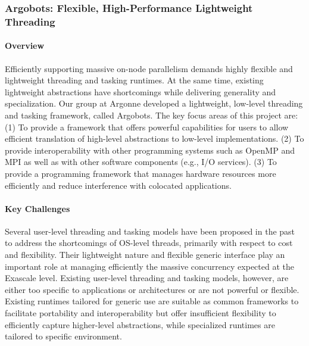 \subsubsection{ Argobots: Flexible, High-Performance Lightweight Threading }

\paragraph{Overview}

Efficiently supporting massive on-node parallelism demands highly
flexible and lightweight threading and tasking runtimes. At the
same time, existing lightweight abstractions have shortcomings while
delivering generality and specialization.  Our group at Argonne
developed a lightweight, low-level threading and tasking framework,
called Argobots.  The key focus areas of this project are: (1) To
provide a framework that offers powerful capabilities for users to
allow efficient translation of high-level abstractions to low-level
implementations. (2) To provide interoperability with other
programming systems such as OpenMP and MPI as well as with other
software components (e.g., I/O services). (3) To provide a programming
framework that manages hardware resources more efficiently and reduce
interference with colocated applications.

\paragraph{Key Challenges}

Several user-level threading and tasking models have been proposed in
the past to address the shortcomings of OS-level threads, primarily
with respect to cost and flexibility. Their lightweight nature and
flexible generic interface play an important role at managing
efficiently the massive concurrency expected at the Exascale level.
Existing user-level threading and tasking models, however, are either
too specific to applications or architectures or are not powerful or
flexible. Existing runtimes tailored for generic use \cite{GNUPth,
PLDI97_Taura, COSET05_Thibault, COB14_Nakashima, MTAAP08_Wheeler,
PPoPP99_Taura, SenSys06_Dunkels, TBB1, EuroPar08_Perache} are suitable
as common frameworks to facilitate portability and interoperability
but offer insufficient flexibility to efficiently capture higher-level
abstractions, while specialized runtimes \cite{ATC02_Adya,
SolarisThreads, SOSP03_von_Behren, StateThreads, PLDI07_Li,
MTAAP09_Porterfield, WMPP05_Cuvillo, IntelOMP, Nanos++, LCPC96_Kale,
PACT14_Treichler} are tailored to specific environment.

